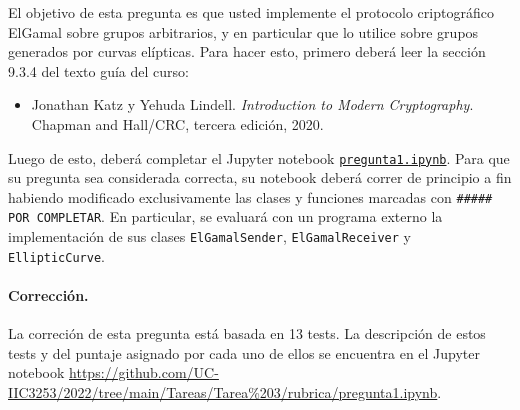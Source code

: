 

El objetivo de esta pregunta es que usted implemente el protocolo criptográfico ElGamal sobre grupos arbitrarios, y en particular que lo utilice sobre grupos generados por curvas elípticas. Para hacer esto, primero deberá leer la sección 9.3.4 del texto guía del curso:

\begin{itemize}
  \item Jonathan Katz y Yehuda Lindell. {\em Introduction to Modern Cryptography}. Chapman and Hall/CRC, tercera edición, 2020.
\end{itemize}

Luego de esto, deberá completar el Jupyter notebook \href{https://github.com/UC-IIC3253/2022/tree/main/Tareas/Tarea\%203/pregunta1.ipynb}{\texttt{pregunta1.ipynb}}. Para que su pregunta sea considerada correcta, su notebook deberá correr de principio a fin habiendo modificado exclusivamente las clases y funciones marcadas con \texttt{\#\#\#\#\# POR COMPLETAR}. En particular, se evaluará con un programa externo la implementación de sus clases \texttt{ElGamalSender}, \texttt{ElGamalReceiver} y \texttt{EllipticCurve}.

\medskip

\paragraph{Corrección.}
La correción de esta pregunta está basada en 13 tests. La descripción de estos tests y del puntaje asignado por cada uno de ellos se encuentra en el Jupyter notebook {\small \url{https://github.com/UC-IIC3253/2022/tree/main/Tareas/Tarea%203/rubrica/pregunta1.ipynb}}.

\medskip
